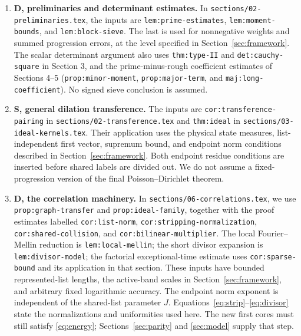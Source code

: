 \begingroup
\raggedright
\begin{enumerate}[leftmargin=*,itemsep=8pt]
\item \textbf{D, preliminaries and determinant estimates.}
In \texttt{sections/02-preliminaries.tex}, the inputs are
\texttt{lem:prime-estimates}, \texttt{lem:moment-bounds}, and
\texttt{lem:block-sieve}. The last is used for nonnegative weights
and summed progression errors, at the level specified in
Section~\ref{sec:framework}.
The scalar determinant argument also uses \texttt{thm:type-II}
and \texttt{det:cauchy-square} in Section 3, and the prime-minus-rough
coefficient estimates of Sections 4--5
(\texttt{prop:minor-moment}, \texttt{prop:major-term}, and
\texttt{maj:long-coefficient}). No signed sieve conclusion is assumed.

\item \textbf{S, general dilation transference.}
The inputs are \texttt{cor:transference-pairing} in
\texttt{sections/02-transference.tex} and \texttt{thm:ideal} in
\texttt{sections/03-ideal-kernels.tex}. Their application uses the
physical state measures, list-independent first vector, supremum
bound, and endpoint norm conditions described in
Section~\ref{sec:framework}. Both endpoint residue conditions are
inserted before shared labels are divided out. We do not assume a
fixed-progression version of the final Poisson--Dirichlet theorem.

\item \textbf{D, the correlation machinery.}
In \texttt{sections/06-correlations.tex}, we use
\texttt{prop:graph-transfer} and \texttt{prop:ideal-family}, together
with the proof estimates labelled \texttt{cor:list-norm},
\texttt{cor:stripping-normalization}, \texttt{cor:shared-collision},
and \texttt{cor:bilinear-multiplier}.
The local Fourier--Mellin reduction is \texttt{lem:local-mellin};
the short divisor expansion is \texttt{lem:divisor-model}; the
factorial exceptional-time estimate uses \texttt{cor:sparse-bound}
and its application in that section.
These inputs have bounded represented-list lengths, the active-band
scales in Section~\ref{sec:framework}, and arbitrary fixed logarithmic
accuracy. The endpoint norm exponent is independent of the shared-list
parameter $J$. Equations~\eqref{eq:strip}--\eqref{eq:divisor} state the
normalizations and uniformities used here. The new first cores must
still satisfy \eqref{eq:energy}; Sections~\ref{sec:parity} and
\ref{sec:model} supply that step.


\end{enumerate}
